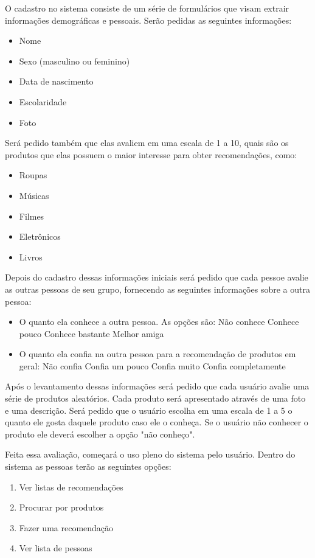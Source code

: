  O cadastro no sistema consiste de um série de formulários que visam extrair informações demográficas e pessoais. Serão pedidas as seguintes informações:
 
\begin{itemize}
	\item Nome
	\item Sexo (masculino ou feminino)
	\item Data de nascimento
	\item Escolaridade
	\item Foto
\end{itemize}

 Será pedido também que elas avaliem em uma escala de 1 a 10, quais são os produtos que elas possuem o maior interesse para obter recomendações, como:

\begin{itemize}
	\item Roupas
	\item Músicas
	\item Filmes
	\item Eletrônicos
	\item Livros
\end{itemize}

	Depois do cadastro dessas informações iniciais será pedido que cada pessoe avalie as outras pessoas de seu grupo, fornecendo as seguintes informações sobre a outra pessoa:

\begin{itemize}
	\item O quanto ela conhece a outra pessoa. As opções são:
	\subitem Não conhece
  \subitem Conhece pouco
  \subitem Conhece bastante
  \subitem Melhor amiga
  \item O quanto ela confia na outra pessoa para a recomendação de produtos em geral:
   \subitem Não confia
	\subitem Confia um pouco
  \subitem Confia muito
  \subitem Confia completamente
\end{itemize}

 Após o levantamento dessas informações será pedido que cada usuário avalie uma série de produtos aleatórios. Cada produto será apresentado através de uma foto e uma descrição. Será pedido que o usuário escolha em uma escala de 1 a 5 o quanto ele gosta daquele produto caso ele o conheça. Se o usuário não conhecer o produto ele deverá escolher a opção "não conheço".

 Feita essa avaliação, começará o uso pleno do sistema pelo usuário. Dentro do sistema as pessoas terão as seguintes opções:
\begin{enumerate}
	\item Ver listas de recomendações
	\item Procurar por produtos
	\item Fazer uma recomendação
	\item Ver lista de pessoas
\end{enumerate}

